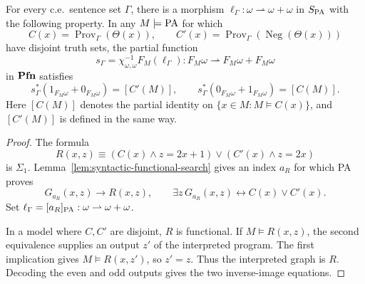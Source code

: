 \begin{lemma}
\label{lem:arithmetic-proof-search}
For every c.e.\ sentence set $\Gamma$, there is a morphism
$\ell_\Gamma:\omega\rightharpoonup\omega+\omega$ in
$S_{\mathrm{PA}}$ with the following property. In any $M\models\mathrm{PA}$
for which
\[
 C(x)=\operatorname{Prov}_\Gamma(\Theta(x)),\qquad
 C'(x)=\operatorname{Prov}_\Gamma(\operatorname{Neg}(\Theta(x)))
\]
have disjoint truth sets, the partial function
\[
 s_\Gamma=\chi_{\omega,\omega}^{-1}F_M(\ell_\Gamma):
       F_M\omega\rightharpoonup F_M\omega+F_M\omega
\]
in $\mathbf{Pfn}$ satisfies
\[
 s_\Gamma^*(1_{F_M\omega}+0_{F_M\omega})=[C'(M)],\qquad
 s_\Gamma^*(0_{F_M\omega}+1_{F_M\omega})=[C(M)].
\]
Here $[C(M)]$ denotes the partial identity on
$\{x\in M:M\models C(x)\}$, and $[C'(M)]$ is defined in the
same way.
\end{lemma}
\begin{proof}
The formula
\[
 R(x,z)\equiv
   (C(x)\land z=2x+1)\lor(C'(x)\land z=2x)
\]
is $\Sigma_1$. Lemma~\ref{lem:syntactic-functional-search}
gives an index $a_R$ for which PA proves
\[
 G_{a_R}(x,z)\longrightarrow R(x,z),\qquad
 \exists z\,G_{a_R}(x,z)\longleftrightarrow C(x)\lor C'(x).
\]
Set $\ell_\Gamma=[a_R]_{\mathrm{PA}}:\omega\rightharpoonup\omega+\omega$.

In a model where $C,C'$ are disjoint, $R$ is functional. If
$M\models R(x,z)$, the second equivalence supplies
an output $z'$ of the interpreted program. The first implication
gives $M\models R(x,z')$, so $z'=z$. Thus the interpreted graph
is $R$. Decoding the even and odd outputs gives the
two inverse-image equations.
\end{proof}

